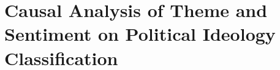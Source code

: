 \chapter{Causal Analysis of Theme and Sentiment on Political Ideology Classification}
\label{sec:causal-inference}








